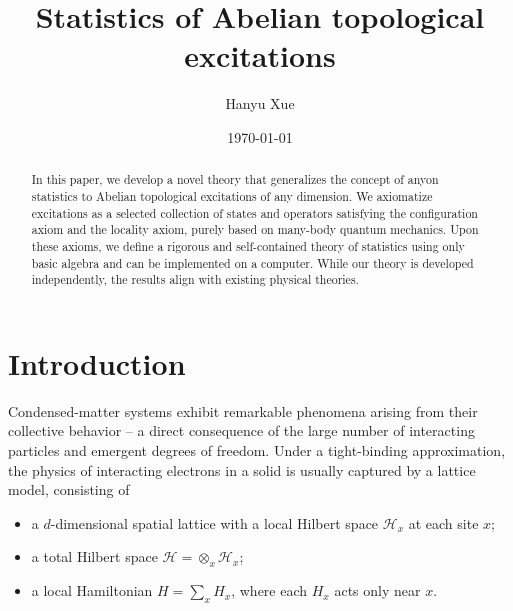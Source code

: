 \documentclass[reprint, amsmath, amssymb, showpacs, floatfix, longbibliography, aps, twocolumn, superscriptaddress, nofootinbib]{revtex4-2}
\theoremstyle{definition}
\begin{document}
\title{Statistics of Abelian topological excitations}

\author{Hanyu Xue}



\begin{abstract}
	In this paper, we develop a novel theory that generalizes the concept of anyon statistics to Abelian topological excitations of any dimension. We axiomatize excitations as a selected collection of states and operators satisfying the configuration axiom and the locality axiom, purely based on many-body quantum mechanics. Upon these axioms, we define a rigorous and self-contained theory of statistics using only basic algebra and can be implemented on a computer. While our theory is developed independently, the results align with existing physical theories.
\end{abstract}

\date{\today}



\maketitle



\tableofcontents

\section{Introduction}


Condensed-matter systems exhibit remarkable phenomena arising from their collective behavior -- a direct consequence of the large number of interacting particles and emergent degrees of freedom. Under a tight-binding approximation, the physics of interacting electrons in a solid is usually captured by a lattice model, consisting of
\begin{itemize}
	\item a $d$-dimensional spatial lattice with a local Hilbert space $\mathcal{H}_x$ at each site $x$;
	\item a total Hilbert space $\mathcal{H}=\otimes_x \mathcal{H}_x$;
	\item a local Hamiltonian $H=\sum_x H_x$, where each $H_x$ acts only near $x$.
\end{itemize}
\end{document}
